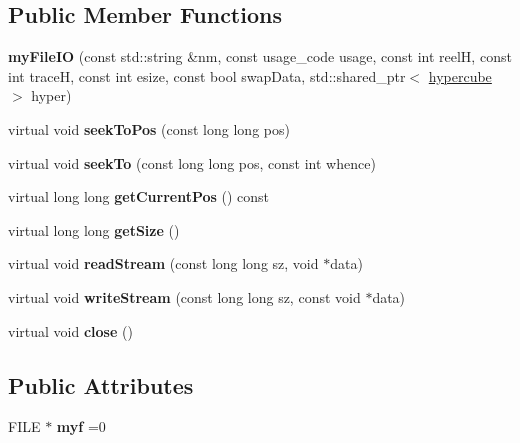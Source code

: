 \subsection*{Public Member Functions}
\begin{DoxyCompactItemize}
\item 
\mbox{\label{class_s_e_p_1_1my_file_i_o_a99ee99b226733ee25b751ff2d3ba787b}} 
{\bfseries my\+File\+IO} (const std\+::string \&nm, const usage\+\_\+code usage, const int reelH, const int traceH, const int esize, const bool swap\+Data, std\+::shared\+\_\+ptr$<$ \hyperlink{class_s_e_p_1_1hypercube}{hypercube} $>$ hyper)
\item 
\mbox{\label{class_s_e_p_1_1my_file_i_o_ac187abd300f65ddf37bd52743f54c110}} 
virtual void {\bfseries seek\+To\+Pos} (const long long pos)
\item 
\mbox{\label{class_s_e_p_1_1my_file_i_o_ad161720744f87b329a133f80813997c7}} 
virtual void {\bfseries seek\+To} (const long long pos, const int whence)
\item 
\mbox{\label{class_s_e_p_1_1my_file_i_o_a3e1bb8828862723a2a75cdf5b357a0f6}} 
virtual long long {\bfseries get\+Current\+Pos} () const
\item 
\mbox{\label{class_s_e_p_1_1my_file_i_o_a6ccf8741995794f6b6c698f6216aed54}} 
virtual long long {\bfseries get\+Size} ()
\item 
\mbox{\label{class_s_e_p_1_1my_file_i_o_a307cb9aa9f64d2adc7b911933410f81f}} 
virtual void {\bfseries read\+Stream} (const long long sz, void $\ast$data)
\item 
\mbox{\label{class_s_e_p_1_1my_file_i_o_a9b061e2d6efc49c107e6e679fead13bc}} 
virtual void {\bfseries write\+Stream} (const long long sz, const void $\ast$data)
\item 
\mbox{\label{class_s_e_p_1_1my_file_i_o_a34ec3b5d69e4a255e574a830f0baa8b6}} 
virtual void {\bfseries close} ()
\end{DoxyCompactItemize}
\subsection*{Public Attributes}
\begin{DoxyCompactItemize}
\item 
\mbox{\label{class_s_e_p_1_1my_file_i_o_a84fe69b90bce113a820455c3c452cc63}} 
F\+I\+LE $\ast$ {\bfseries myf} =0
\end{DoxyCompactItemize}
